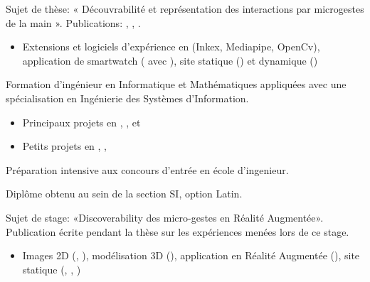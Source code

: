 \documentclass[10pt,a4paper,ragged2e,withhyper]{altacv}
\begin{document}
\begin{paracol}{2}


Sujet de thèse: « Découvrabilité et représentation des interactions par microgestes de la main ». Publications: \cite{lambert_simultaneous_2024}, \cite{lambert_visual_2023}, \cite{lambert_doctoral_consortium}.

\begin{itemize}
\item Extensions  et logiciels d'expérience en  (Inkex, Mediapipe, OpenCv), application de smartwatch ( avec ), site statique () et dynamique ()
\end{itemize}

\divider


Formation d’ingénieur en Informatique et Mathématiques appliquées avec une
spécialisation en Ingénierie des Systèmes d’Information.
\begin{itemize}
\item Principaux projets en , ,  et 
\item Petits projets en , , 
\end{itemize}

\divider


Préparation intensive aux concours d’entrée en école d’ingenieur.

\divider


Diplôme obtenu au sein de la section SI, option Latin.

\medskip


Sujet de stage: «Discoverability des micro-gestes en Réalité Augmentée». Publication \cite{lambert_visual_2023} écrite pendant la thèse sur les expériences menées lors de ce stage.
\begin{itemize}
  \item Images 2D (, ), modélisation 3D (), application en Réalité Augmentée (), site statique (, , )
\end{itemize}


\end{paracol}
\end{document}
